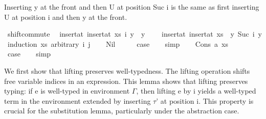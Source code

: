 \begin{isabellebody}
%
\begin{isamarkuptext}%
Inserting y at the front and then U at position Suc i is the same as
  first inserting U at position i and then y at the front.%
\end{isamarkuptext}\isamarkuptrue%
\isamarkupfalse%
\ shift{\isacharunderscore}{\kern0pt}commute{\isacharcolon}{\kern0pt}\isanewline
\ \ {\isachardoublequoteopen}insert{\isacharunderscore}{\kern0pt}at\ {\isacharparenleft}{\kern0pt}insert{\isacharunderscore}{\kern0pt}at\ xs\ i\ y{}{\isacharparenright}{\kern0pt}\ {}\ y{}\isanewline
\ \ \ {\isacharequal}{\kern0pt}\ insert{\isacharunderscore}{\kern0pt}at\ {\isacharparenleft}{\kern0pt}insert{\isacharunderscore}{\kern0pt}at\ xs\ {}\ y{}{\isacharparenright}{\kern0pt}\ {\isacharparenleft}{\kern0pt}Suc\ i{\isacharparenright}{\kern0pt}\ y{}{\isachardoublequoteclose}\isanewline
%
\isadelimproof
%
\endisadelimproof
%
\isatagproof
{}\isamarkupfalse%
\ {\isacharparenleft}{\kern0pt}induction\ xs\ arbitrary{\isacharcolon}{\kern0pt}\ i\ j{\isacharparenright}{\kern0pt}\isanewline
\ \ \isamarkupfalse%
\ Nil\isanewline
\ \ \isamarkupfalse%
\ \isamarkupfalse%
\ {\isacharquery}{\kern0pt}case\isanewline
\ \ \isamarkupfalse%
\ simp\isanewline
{}\isamarkupfalse%
\isanewline
\ \ \isamarkupfalse%
\ {\isacharparenleft}{\kern0pt}Cons\ a\ xs{\isacharparenright}{\kern0pt}\isanewline
\ \ \isamarkupfalse%
\ \isamarkupfalse%
\ {\isacharquery}{\kern0pt}case\isanewline
\ \ \isamarkupfalse%
\ simp\isanewline
{}\isamarkupfalse%
%
\endisatagproof
{\isafoldproof}%
%
\isadelimproof
%
\endisadelimproof
%
\isadelimdocument
%
\endisadelimdocument
%
\isatagdocument
%
\isamarkuptrue%
%
\isamarkuptrue%
%
\endisatagdocument
{\isafolddocument}%
%
\isadelimdocument
%
\endisadelimdocument
%
\begin{isamarkuptext}%
We first show that lifting preserves well-typedness.
  The lifting operation shifts free variable indices in an expression.
  This lemma shows that lifting preserves typing:
  if e is well-typed in environment $\Gamma$,
  then lifting e by i yields a well-typed term in the environment
  extended by inserting $\tau$' at position i.
  This property is crucial for the substitution lemma,
  particularly under the abstraction case.%

\end{isamarkuptext}
\end{isabellebody}
